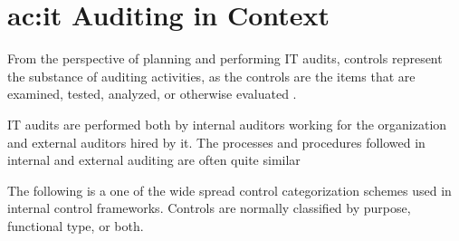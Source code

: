 
\section{\gls{ac:it} Auditing in Context}

From the perspective of planning and performing IT audits, controls represent the substance of auditing activities, as the controls are the items that are examined, tested, analyzed, or otherwise evaluated \citep{GANTZ20141}.


IT audits are performed both by internal auditors working for the organization and external auditors hired by it. The processes and procedures followed in internal and external auditing are often quite similar





The following is a one of the wide spread control categorization schemes used in internal control frameworks. Controls are normally classified by purpose, functional type, or both.

